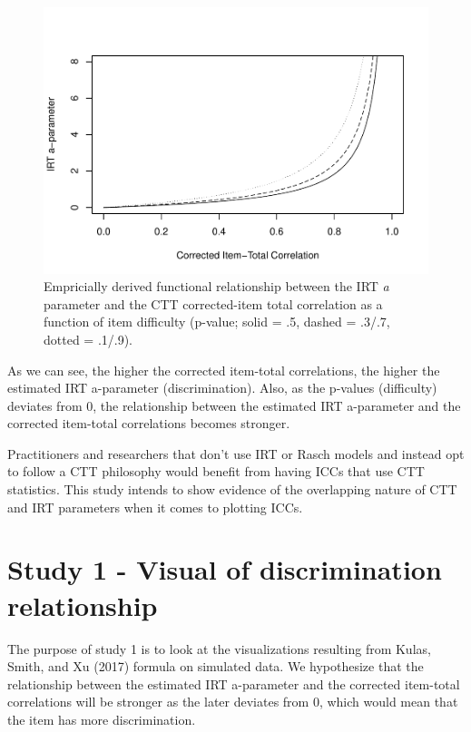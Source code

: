 \documentclass[
  english,
  man]{apa6}
\begin{document}
\begin{figure}
\centering
\includegraphics{ICC_project_files/figure-latex/acorrected-1.pdf}
\caption{\label{fig:acorrected}Empricially derived functional relationship between the IRT \emph{a} parameter and the CTT corrected-item total correlation as a function of item difficulty (p-value; solid = .5, dashed = .3/.7, dotted = .1/.9).}
\end{figure}

As we can see, the higher the corrected item-total correlations, the higher the estimated IRT a-parameter (discrimination). Also, as the p-values (difficulty) deviates from 0, the relationship between the estimated IRT a-parameter and the corrected item-total correlations becomes stronger.

Practitioners and researchers that don't use IRT or Rasch models and instead opt to follow a CTT philosophy would benefit from having ICCs that use CTT statistics. This study intends to show evidence of the overlapping nature of CTT and IRT parameters when it comes to plotting ICCs.

\hypertarget{study-1---visual-of-discrimination-relationship}{%
\section{Study 1 - Visual of discrimination relationship}\label{study-1---visual-of-discrimination-relationship}}

The purpose of study 1 is to look at the visualizations resulting from Kulas, Smith, and Xu (2017) formula on simulated data. We hypothesize that the relationship between the estimated IRT a-parameter and the corrected item-total correlations will be stronger as the later deviates from 0, which would mean that the item has more discrimination.
\end{document}
